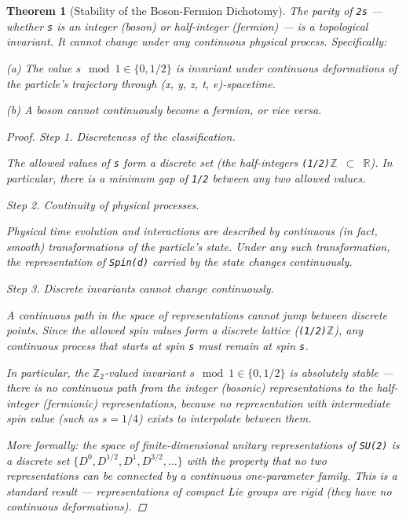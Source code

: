 \documentclass[aps,prd,preprint,superscriptaddress,longbibliography,floatfix]{revtex4-2}
\newtheorem{theorem}{Theorem}[section]
\theoremstyle{remark}
\begin{document}
\begin{theorem}[Stability of the Boson-Fermion Dichotomy]
\label{thm:B12} \textit{The parity of \texttt{2s} --- whether \texttt{s} is an integer (boson) or half-integer (fermion) --- is a topological invariant. It cannot change under any continuous physical process. Specifically:}

\textit{(a) The value $s \mod 1 \in \{0, 1/2\}$ is invariant under continuous deformations of the particle's trajectory through (x, y, z, t, e)-spacetime.}

\textit{(b) A boson cannot continuously become a fermion, or vice versa.}

\begin{proof}

\textit{Step 1. Discreteness of the classification.}

The allowed values of \texttt{s} form a discrete set (the half-integers \texttt{(1/2)$\mathbb{Z}$ $\subset$ $\mathbb{R}$}). In particular, there is a minimum gap of \texttt{1/2} between any two allowed values.

\textit{Step 2. Continuity of physical processes.}

Physical time evolution and interactions are described by continuous (in fact, smooth) transformations of the particle's state. Under any such transformation, the representation of \texttt{Spin(d)} carried by the state changes continuously.

\textit{Step 3. Discrete invariants cannot change continuously.}

A continuous path in the space of representations cannot jump between discrete points. Since the allowed spin values form a discrete lattice (\texttt{(1/2)$\mathbb{Z}$}), any continuous process that starts at spin \texttt{s} must remain at spin \texttt{s}.

In particular, the $\mathbb{Z}_{2}$-valued invariant $s \mod 1 \in \{0, 1/2\}$ is absolutely stable --- there is no continuous path from the integer (bosonic) representations to the half-integer (fermionic) representations, because no representation with intermediate spin value (such as $s = 1/4$) exists to interpolate between them.

More formally: the space of finite-dimensional unitary representations of \texttt{SU(2)} is a discrete set $\{D^{0}, D^{1/2}, D^{1}, D^{3/2}, \ldots\}$ with the property that no two representations can be connected by a continuous one-parameter family. This is a standard result --- representations of compact Lie groups are rigid (they have no continuous deformations). \end{proof}
\end{theorem}
\end{document}
